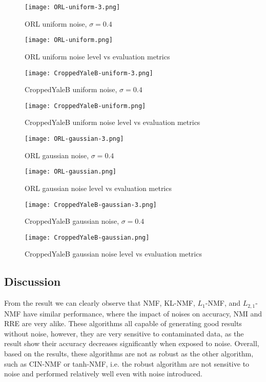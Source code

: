\documentclass{article} %
\begin{document}
\begin{figure}
\texttt{[image: ORL-uniform-3.png]}
\caption{ORL uniform noise, $\sigma=0.4$ \label{fig:ORL-uniform-3}}
\end{figure}
\begin{figure}
\texttt{[image: ORL-uniform.png]}
\caption{ORL uniform noise level vs evaluation metrics \label{fig:ORL-uniform}}
\end{figure}
\begin{figure}
\texttt{[image: CroppedYaleB-uniform-3.png]}
\caption{CroppedYaleB uniform noise, $\sigma=0.4$ \label{fig:CroppedYaleB-uniform-3}}
\end{figure}
\begin{figure}
\texttt{[image: CroppedYaleB-uniform.png]}
\caption{CroppedYaleB uniform noise level vs evaluation metrics \label{fig:CroppedYaleB-uniform}}
\end{figure}

\begin{figure}
\texttt{[image: ORL-gaussian-3.png]}
\caption{ORL gaussian noise, $\sigma=0.4$ \label{fig:ORL-gaussian-3}}
\end{figure}
\begin{figure}
\texttt{[image: ORL-gaussian.png]}
\caption{ORL gaussian noise level vs evaluation metrics \label{fig:ORL-gaussian}}
\end{figure}
\begin{figure}
\texttt{[image: CroppedYaleB-gaussian-3.png]}
\caption{CroppedYaleB gaussian noise, $\sigma=0.4$ \label{fig:CroppedYaleB-gaussian-3}}
\end{figure}
\begin{figure}
\texttt{[image: CroppedYaleB-gaussian.png]}
\caption{CroppedYaleB gaussian noise level vs evaluation metrics \label{fig:CroppedYaleB-gaussian}}
\end{figure}


\subsection{Discussion}
From the result we can clearly observe that NMF, KL-NMF, $L_1$-NMF, and $L_{2,1}$-NMF have similar performance, where the impact of noises on accuracy, NMI and RRE are very alike. These algorithms all capable of generating good results without noise, however, they are very sensitive to contaminated data, as the result show their accuracy decreases significantly when exposed to noise. Overall, based on the results, these algorithms are not as robust as the other algorithm, such as CIN-NMF or tanh-NMF, i.e. the robust algorithm are not sensitive to noise and performed relatively well even with noise introduced.
\end{document}
